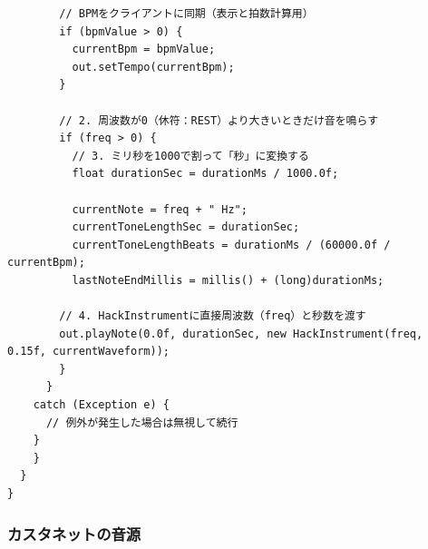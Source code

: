 \begin{lstlisting}
        // BPMをクライアントに同期（表示と拍数計算用）
        if (bpmValue > 0) {
          currentBpm = bpmValue;
          out.setTempo(currentBpm);
        }

        // 2. 周波数が0（休符：REST）より大きいときだけ音を鳴らす
        if (freq > 0) {
          // 3. ミリ秒を1000で割って「秒」に変換する
          float durationSec = durationMs / 1000.0f;

          currentNote = freq + " Hz";
          currentToneLengthSec = durationSec;
          currentToneLengthBeats = durationMs / (60000.0f / currentBpm);
          lastNoteEndMillis = millis() + (long)durationMs;

        // 4. HackInstrumentに直接周波数（freq）と秒数を渡す
        out.playNote(0.0f, durationSec, new HackInstrument(freq, 0.15f, currentWaveform));
        }
      }
    catch (Exception e) {
      // 例外が発生した場合は無視して続行
    }
    }
  }
}
\end{lstlisting}

\subsubsection{カスタネットの音源}


